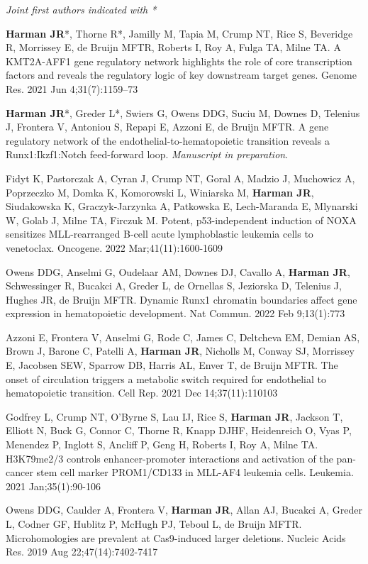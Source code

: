\textit{Joint first authors indicated with *}

\noindent
\textbf{Harman JR}*, Thorne R*, Jamilly M, Tapia M, Crump NT, Rice S, Beveridge R, Morrissey E, de Bruijn MFTR, Roberts I, Roy A, Fulga TA, Milne TA. A KMT2A-AFF1 gene regulatory network highlights the role of core transcription factors and reveals the regulatory logic of key downstream target genes. Genome Res. 2021 Jun 4;31(7):1159–73

\noindent
\textbf{Harman JR}*, Greder L*, Swiers G, Owens DDG, Suciu M, Downes D, Telenius J, Frontera V, Antoniou S, Repapi E, Azzoni E, de Bruijn MFTR. A gene regulatory network of the endothelial-to-hematopoietic transition reveals a Runx1:Ikzf1:Notch feed-forward loop. \textit{Manuscript in preparation}.

\noindent
Fidyt K, Pastorczak A, Cyran J, Crump NT, Goral A, Madzio J, Muchowicz A, Poprzeczko M, Domka K, Komorowski L, Winiarska M, \textbf{Harman JR}, Siudakowska K, Graczyk-Jarzynka A, Patkowska E, Lech-Maranda E, Mlynarski W, Golab J, Milne TA, Firczuk M. Potent, p53-independent induction of NOXA sensitizes MLL-rearranged B-cell acute lymphoblastic leukemia cells to venetoclax. Oncogene. 2022 Mar;41(11):1600-1609

\noindent
Owens DDG, Anselmi G, Oudelaar AM, Downes DJ, Cavallo A, \textbf{Harman JR}, Schwessinger R, Bucakci A, Greder L, de Ornellas S, Jeziorska D, Telenius J, Hughes JR, de Bruijn MFTR. Dynamic Runx1 chromatin boundaries affect gene expression in hematopoietic development. Nat Commun. 2022 Feb 9;13(1):773

\noindent
Azzoni E, Frontera V, Anselmi G, Rode C, James C, Deltcheva EM, Demian AS, Brown J, Barone C, Patelli A, \textbf{Harman JR}, Nicholls M, Conway SJ, Morrissey E, Jacobsen SEW, Sparrow DB, Harris AL, Enver T, de Bruijn MFTR. The onset of circulation triggers a metabolic switch required for endothelial to hematopoietic transition. Cell Rep. 2021 Dec 14;37(11):110103

\noindent
Godfrey L, Crump NT, O'Byrne S, Lau IJ, Rice S, \textbf{Harman JR}, Jackson T, Elliott N, Buck G, Connor C, Thorne R, Knapp DJHF, Heidenreich O, Vyas P, Menendez P, Inglott S, Ancliff P, Geng H, Roberts I, Roy A, Milne TA. H3K79me2/3 controls enhancer-promoter interactions and activation of the pan-cancer stem cell marker PROM1/CD133 in MLL-AF4 leukemia cells. Leukemia. 2021 Jan;35(1):90-106

\noindent
Owens DDG, Caulder A, Frontera V, \textbf{Harman JR}, Allan AJ, Bucakci A, Greder L, Codner GF, Hublitz P, McHugh PJ, Teboul L, de Bruijn MFTR. Microhomologies are prevalent at Cas9-induced larger deletions. Nucleic Acids Res. 2019 Aug 22;47(14):7402-7417

